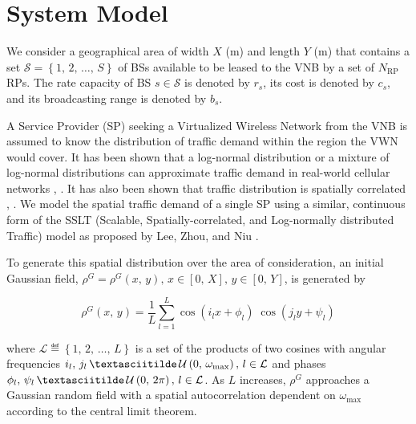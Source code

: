 \documentclass[onecolumn,draftcls]{IEEEtran}
\begin{document}


\section{System Model} \label{sec:model}
We consider a geographical area of width $X$ (m) and length $Y$ (m) that contains a set $\mathcal{S} = \left\{1,\, 2,\, \ldots,\, S\right\}$ of BSs available to be leased to the VNB by a set of $N_\text{RP}$ RPs.  The rate capacity of BS $s \in \mathcal{S}$ is denoted by $r_s$, its cost is denoted by $c_s$, and its broadcasting range is denoted by $b_s$.

A Service Provider (SP) seeking a Virtualized Wireless Network from the VNB is assumed to know the distribution of traffic demand within the region the VWN would cover.  It has been shown that a log-normal distribution or a mixture of log-normal distributions can approximate traffic demand in real-world cellular networks \cite{686105}, \cite{5936263}.  It has also been shown that traffic distribution is spatially correlated \cite{5936263}, \cite{eigenplaces}.  We model the spatial traffic demand of a single SP using a similar, continuous form of the SSLT (Scalable, Spatially-correlated, and Log-normally distributed Traffic) model as proposed by Lee, Zhou, and Niu \cite{6554749}.

To generate this spatial distribution over the area of consideration, an initial Gaussian field, $\rho^G = \rho^G\left(x,\, y\right),\, x \in \left[0,\, X\right],\, y \in \left[0,\, Y\right]$, is generated by

\begin{equation}
\rho^G\left(x,\, y\right)=\frac{1}{L}\sum_{l=1}^L \cos\left(i_lx+\phi_l\right) \; \cos\left(j_ly+\psi_l\right)
\end{equation}

\noindent \sloppy where $\mathcal{L} \eqdef \left\{1,\, 2,\, \ldots,\, L\right\}$ is a set of the products of two cosines with angular frequencies $i_l,\, j_l\, \textasciitilde\, \mathcal{U}\left(0,\, \omega_{\max}\right),\, l \in \mathcal{L}$ and phases $\phi_l,\, \psi_l\, \textasciitilde\, \mathcal{U}\left(0,\, 2\pi\right),\, l \in \mathcal{L}$.  As $L$ increases, $\rho^G$ approaches a Gaussian random field with a spatial autocorrelation dependent on $\omega_{\max}$ according to the central limit theorem.
\end{document}
